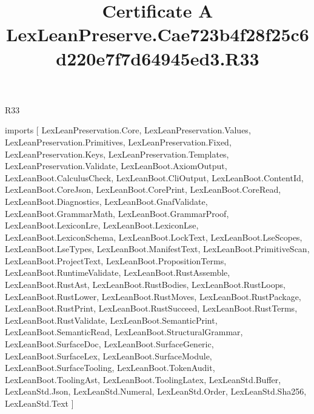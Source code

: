 \begin{lexlean}{R33}
\title{Certificate A LexLeanPreserve.Cae723b4f28f25c6d220e7f7d64945ed3.R33}
\begin{coremodule}
imports [
  LexLeanPreservation.Core,
  LexLeanPreservation.Values,
  LexLeanPreservation.Primitives,
  LexLeanPreservation.Fixed,
  LexLeanPreservation.Keys,
  LexLeanPreservation.Templates,
  LexLeanPreservation.Validate,
  LexLeanBoot.AxiomOutput,
  LexLeanBoot.CalculusCheck,
  LexLeanBoot.CliOutput,
  LexLeanBoot.ContentId,
  LexLeanBoot.CoreJson,
  LexLeanBoot.CorePrint,
  LexLeanBoot.CoreRead,
  LexLeanBoot.Diagnostics,
  LexLeanBoot.GnafValidate,
  LexLeanBoot.GrammarMath,
  LexLeanBoot.GrammarProof,
  LexLeanBoot.LexiconLre,
  LexLeanBoot.LexiconLse,
  LexLeanBoot.LexiconSchema,
  LexLeanBoot.LockText,
  LexLeanBoot.LseScopes,
  LexLeanBoot.LseTypes,
  LexLeanBoot.ManifestText,
  LexLeanBoot.PrimitiveScan,
  LexLeanBoot.ProjectText,
  LexLeanBoot.PropositionTerms,
  LexLeanBoot.RuntimeValidate,
  LexLeanBoot.RustAssemble,
  LexLeanBoot.RustAst,
  LexLeanBoot.RustBodies,
  LexLeanBoot.RustLoops,
  LexLeanBoot.RustLower,
  LexLeanBoot.RustMoves,
  LexLeanBoot.RustPackage,
  LexLeanBoot.RustPrint,
  LexLeanBoot.RustSucceed,
  LexLeanBoot.RustTerms,
  LexLeanBoot.RustValidate,
  LexLeanBoot.SemanticPrint,
  LexLeanBoot.SemanticRead,
  LexLeanBoot.StructuralGrammar,
  LexLeanBoot.SurfaceDoc,
  LexLeanBoot.SurfaceGeneric,
  LexLeanBoot.SurfaceLex,
  LexLeanBoot.SurfaceModule,
  LexLeanBoot.SurfaceTooling,
  LexLeanBoot.TokenAudit,
  LexLeanBoot.ToolingAst,
  LexLeanBoot.ToolingLatex,
  LexLeanStd.Buffer,
  LexLeanStd.Json,
  LexLeanStd.Numeral,
  LexLeanStd.Order,
  LexLeanStd.Sha256,
  LexLeanStd.Text
]


\end{coremodule}
\end{lexlean}
